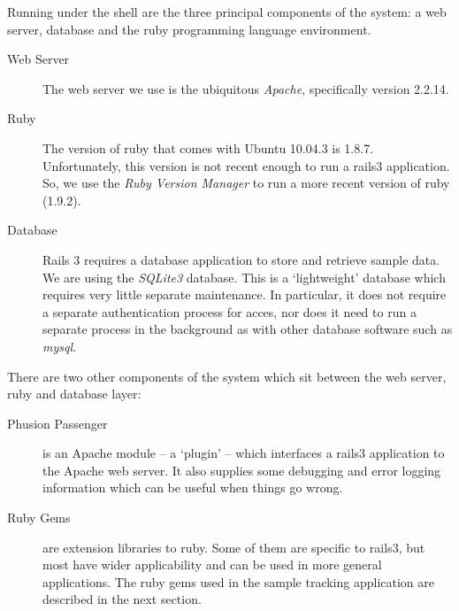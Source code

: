 \documentclass[12pt,twoside]{article}
\begin{document}
Running under the shell are the three principal components of
the system: a web server, database and the ruby programming language
environment.
\begin{description}
\item[Web Server]
The web server we use is the ubiquitous \emph{Apache}, specifically
version 2.2.14.
\item[Ruby]
The version of ruby that comes with Ubuntu 10.04.3 is 1.8.7.
Unfortunately, this version is not recent enough to run a rails3
application. So, we use the \emph{Ruby Version Manager} to run a more
recent version of ruby (1.9.2).
\item[Database]
Rails 3 requires a database application to store and retrieve sample data.
We are using the \emph{SQLite3} database. This is a `lightweight' database
which requires very little separate maintenance. In particular, it
does not require a separate authentication process for acces, nor
does it need to run a separate process in the background as with other
database software such as \emph{mysql}.
\end{description}

There are two other components of the system which sit between the
web server, ruby and database layer:

\begin{description}
\item[Phusion Passenger]
is an Apache module -- a `plugin' -- which
interfaces a rails3 application to the Apache web server. It also supplies
some debugging and error logging information which can be useful when
things go wrong.
\item[Ruby Gems]
are extension libraries to ruby. Some of them are
specific to rails3, but most have wider applicability and can be used in
more general applications. The ruby gems used in the sample tracking
application are described in the next section.
\end{description}
\end{document}
